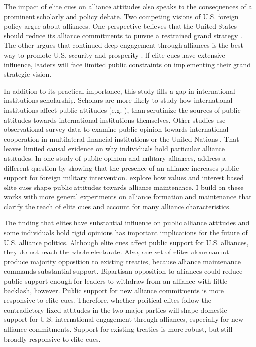\documentclass[12pt]{article}
\begin{document}
The impact of elite cues on alliance attitudes also speaks to the consequences of a prominent scholarly and policy debate. 
Two competing visions of U.S. foreign policy argue about alliances. 
One perspective believes that the United States should reduce its alliance commitments to pursue a restrained grand strategy \citep{Preble2009, Posen2014}.
The other argues that continued deep engagement through alliances is the best way to promote U.S. security and prosperity \citep{Brooksetal2013, BrandsFeaver2017}. 
If elite cues have extensive influence, leaders will face limited public constraints on implementing their grand strategic vision. 


In addition to its practical importance, this study fills a gap in international institutions scholarship. 
Scholars are more likely to study how international institutions affect public attitudes (e.g. \citep{KayaWalker2014, Greenhill2020}), than scrutinize the sources of public attitudes towards international institutions themselves. 
Other studies use observational survey data to examine public opinion towards international cooperation in multilateral financial institutions \citep{Edwards2009} or the United Nations \citep{Torgler2008, DellmuthTallberg2015}. 
That leaves limited causal evidence on why individuals hold particular alliance attitudes.
In one study of public opinion and military alliances, \citet{TomzWeeks2021} address a different question by showing that the presence of an alliance increases public support for foreign military intervention. 
\citet{Chuetal2021} explore how values and interest based elite cues shape public attitudes towards alliance maintenance. 
I build on these works with more general experiments on alliance formation and maintenance that clarify the reach of elite cues and account for many alliance characteristics. 


The finding that elites have substantial influence on public alliance attitudes and some individuals hold rigid opinions has important implications for the future of U.S. alliance politics. 
Although elite cues affect public support for U.S. alliances, they do not reach the whole electorate.
Also, one set of elites alone cannot produce majority opposition to existing treaties, because alliance maintenance commands substantial support.
Bipartisan opposition to alliances could reduce public support enough for leaders to withdraw from an alliance with little backlash, however.  
Public support for new alliance commitments is more responsive to elite cues. 
Therefore, whether political elites follow the contradictory fixed attitudes in the two major parties will shape domestic support for U.S. international engagement through alliances, especially for new alliance commitments.
Support for existing treaties is more robust, but still broadly responsive to elite cues.
\end{document}
